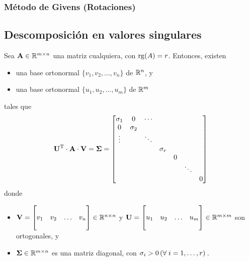 \subsubsection{Método de Givens (Rotaciones)}
\subsection{Descomposición en valores singulares}


Sea $\mathbf{A} \in \mathbb{R}^{m \times n}$ una matriz cualquiera, con $\operatorname{rg}(A) = r$.
Entonces, existen
\begin{itemize}
\item una base ortonormal $\lbrace v_1, v_2, \dots, v_n \rbrace$ de $\mathbb{R}^n$, y
\item una base ortonormal $\lbrace u_1, u_2, \dots, u_m \rbrace$ de $\mathbb{R}^m$
\end{itemize}
tales que
\[ \mathbf{U}^{\mathrm{T}} \cdot \mathbf{A} \cdot \mathbf{V} = \mathbf{\Sigma} = \begin{bmatrix}
\sigma_1 & 0        & \cdots   &    &          &          &          \\
0        & \sigma_2 &          &          &          &          &          \\
\vdots   &          & \ddots   &          &          &          &          \\
         &          &          & \sigma_r &          &          &          \\
         &          &          &          & 0        &          &          \\
         &          &          &          &          & \ddots   &          \\
         &          &          &          &          &          & 0
\end{bmatrix} \]
donde
\begin{itemize}
\item $\mathbf{V} = \begin{bmatrix}
            &     &        &     \\
        v_1 & v_2 & \dots  & v_n \\
            &     &        &     \\
    \end{bmatrix} \in \mathbb{R}^{n \times n}$ y
    $\mathbf{U} = \begin{bmatrix}
            &     &        &     \\
        u_1 & u_2 & \dots  & u_m \\
            &     &        &     \\
    \end{bmatrix} \in \mathbb{R}^{m \times m}$ son ortogonales, y
\item $\mathbf{\Sigma} \in \mathbb{R}^{m \times n}$ es una matriz diagonal,
    con $\sigma_i > 0 \left(\forall\;i = 1, \dots, r\right)\,$.
\end{itemize}

